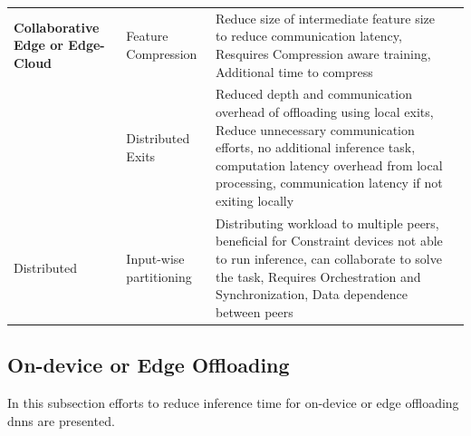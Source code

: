 \begin{minipage}[t]{\linewidth}
\begin{footnotesize}
\begin{longtabu}{>{\bfseries}X[c]|X[c]|X[3c]|X[0.5c]}
	Collaborative Edge or Edge-Cloud & Feature Compression & Reduce size of intermediate feature size to reduce communication latency, Resquires Compression aware training, Additional time to compress & \cite{kang_neurosurgeon:_2017,choi_near-lossless_2018, choi_deep_2018, eshratifar_bottlenet:_2019} \tabularnewline
	
	& Distributed Exits & Reduced depth and communication overhead of offloading using local exits, Reduce unnecessary communication efforts, no additional inference task, computation latency overhead from local processing, communication latency if not exiting locally & \cite{leroux_cascading_2017,teerapittayanon_distributed_2017, li_edge_2018} \tabularnewline\hline
	
	Distributed & Input-wise partitioning & Distributing workload to multiple peers, beneficial for Constraint devices not able to run inference, can collaborate to solve the task, Requires Orchestration and Synchronization, Data dependence between peers & \cite{mao_modnn:_2017, zhao_deepthings:_2018}
	\tabularnewline

	\bottomrule
\end{longtabu}
\end{footnotesize}
\end{minipage}

\subsection{On-device or Edge Offloading}

In this subsection efforts to reduce inference time for on-device or edge offloading \gls{dnn}s are presented.

